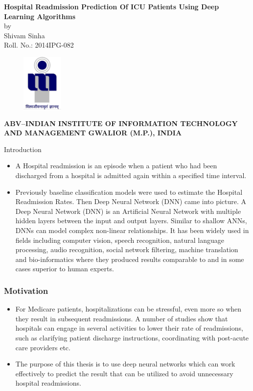 \documentclass{beamer}
\begin{document}
\begin{frame}
\begin{center}
{\bf \large{{\textup{\textbf{\textup{{Hospital Readmission Prediction Of ICU Patients Using Deep Learning Algorithms}}}}}}
\\[0.4in]}
by\\[0.2in]
{ {Shivam Sinha}}\\[0.1in]
{Roll. No.: 2014IPG-082}\\
\begin{figure}[ht]
\centering
\includegraphics[height=.8in,width=0.8in]{logo.pdf}\\
\end{figure}
{{\bf ABV--INDIAN INSTITUTE OF INFORMATION TECHNOLOGY AND MANAGEMENT GWALIOR (M.P.), INDIA\\[0.1in]}
}
\end{center}
\end{frame}


\begin{frame}{Introduction}
    \begin{itemize}
        \item A Hospital readmission is an episode when a patient who had been discharged from a hospital is admitted again within a specified time interval.
        \item Previously baseline classification models were used to estimate the Hospital Readmission Rates. Then Deep Neural Network (DNN) came into picture. A Deep Neural Network (DNN) is an Artificial Neural Network with multiple hidden layers between the input and output layers. Similar to shallow ANNs, DNNs can model complex non-linear relationships. It has been widely used in fields including computer vision, speech recognition, natural language processing, audio recognition, social network filtering, machine translation and bio-informatics where they produced results comparable to and in some cases superior to human experts.
    \end{itemize}
\end{frame}

\begin{frame}\frametitle{Motivation}
\begin{itemize}
\item For Medicare patients, hospitalizations can be stressful, even more so when they result in subsequent readmissions. A number of studies show that hospitals can engage in several activities to lower their rate of readmissions, such as clarifying patient discharge instructions, coordinating with post-acute care providers etc.
\item The purpose of this thesis is to use  deep neural networks which can work effectively to predict the result that can be utilized to avoid unnecessary hospital readmissions.
\end{itemize}
\end{frame}
\end{document}
